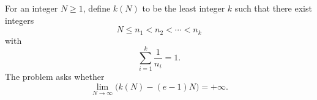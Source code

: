 For an integer $N\ge1$, define $k(N)$ to be the least integer $k$ such that there exist integers
\[
N\le n_1<n_2<\cdots<n_k
\]
with
\[
\sum_{i=1}^k \frac1{n_i}=1.
\]
The problem asks whether
\[
\lim_{N\to\infty}\bigl(k(N)-(e-1)N\bigr)=+\infty.
\]
